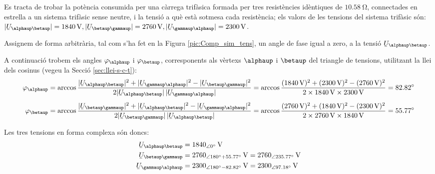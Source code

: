 \begin{exemple}
    Es tracta de trobar la pot\`{e}ncia consumida per una c\`{a}rrega trif\`{a}sica
    formada per tres resist\`{e}ncies id\`{e}ntiques de $\SI{10,58}{\ohm}$,
    connectades en estrella a un sistema trif\`{a}sic sense neutre, i la
    tensi\'{o} a qu\`{e} est\`{a} sotmesa cada resist\`{e}ncia; els valors de les
    tensions del sistema trif\`{a}sic s\'{o}n: $|\cmplx{U}_{\alphaup\betaup}| =
    \SI{1840}{V}, |\cmplx{U}_{\betaup\gammaup}| = \SI{2760}{V},
    |\cmplx{U}_{\gammaup\alphaup}| = \SI{2300}{V}$.

    Assignem de forma arbitr\`{a}ria, tal com s'ha fet en la Figura
    \vref{pic:Comp_sim_tens}, un angle de fase igual a zero, a la tensi\'{o}
    $\cmplx{U}_{\alphaup\betaup}$.

    A continuaci\'{o} trobem els angles $\varphi_\alphaup$ i $\varphi_\betaup$,
    corresponents als v\`{e}rtexs  $\alphaup$ i $\betaup$ del triangle de
    tensions, utilitzant la llei dels cosinus (vegeu la Secci\'{o}
    \vref{sec:llei-s-c-t}): 
    \begin{align*}
        \varphi_\alphaup &= \arccos \frac{|\cmplx{U}_{\alphaup\betaup}|^2 + |\cmplx{U}_{\gammaup\alphaup}|^2 -
        |\cmplx{U}_{\betaup\gammaup}|^2}{2 |\cmplx{U}_{\alphaup\betaup}| \,|\cmplx{U}_{\gammaup\alphaup}|} =
        \arccos \frac{(\SI{1840}{V})^2 + (\SI{2300}{V})^2 - (\SI{2760}{V})^2}{2 \times \SI{1840}{V}
        \times \SI{2300}{V}} = \ang{82,82} \\[1ex]
        \varphi_\betaup &= \arccos \frac{|\cmplx{U}_{\betaup\gammaup}|^2 + |\cmplx{U}_{\alphaup\betaup}|^2 -
        |\cmplx{U}_{\gammaup\alphaup}|^2}{2 |\cmplx{U}_{\betaup\gammaup}| \,|\cmplx{U}_{\alphaup\betaup}|} =
        \arccos \frac{(\SI{2760}{V})^2 + (\SI{1840}{V})^2 - (\SI{2300}{V})^2}{2 \times \SI{2760}{V}
        \times \SI{1840}{V}} = \ang{55,77}
    \end{align*}

    Les tres tensions en forma complexa s\'{o}n doncs:
    \begin{align*}
    \cmplx{U}_{\alphaup\betaup} &= \SIpd{1840}{0}{V} \\
    \cmplx{U}_{\betaup\gammaup} &= \num{2760}_{\angle\ang{180} + \ang{55,77}}\unit{V} =
    \SIpd{2760}{235,77}{V} \\
    \cmplx{U}_{\gammaup\alphaup} &= \num{2300}_{\angle\ang{180} - \ang{82,82}}\unit{V} = \SIpd{2300}{97,18}{V}
    \end{align*}


\end{exemple}
